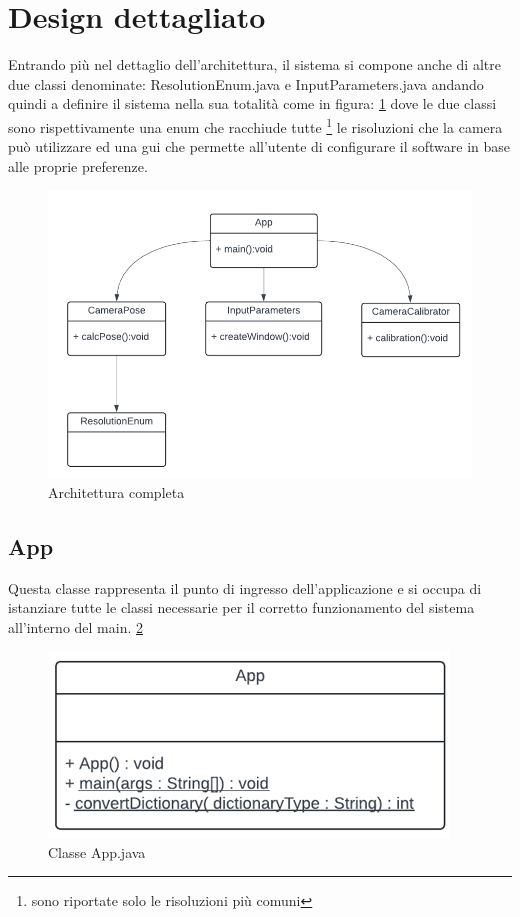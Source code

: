 \documentclass[12pt,a4paper,openright,twoside]{book}
\begin{document}
\section{Design dettagliato}
Entrando più nel dettaglio dell'architettura, il sistema si compone anche di altre due classi denominate: ResolutionEnum.java e InputParameters.java andando quindi a definire il sistema nella sua totalità come in figura: \ref{fig:architettura_completa}
dove le due classi sono rispettivamente una enum che racchiude tutte \footnote{sono riportate solo le risoluzioni più comuni} le risoluzioni che la camera può utilizzare ed una \acrfull{gui} che permette all'utente di configurare il software in base alle proprie preferenze.
\begin{figure}
	\centering
	\includegraphics[width=0.8\linewidth]{./figures/UML/fullArchitecture.png}
	\caption{Architettura completa}
	\label{fig:architettura_completa}
\end{figure}
\subsection{App}
Questa classe rappresenta il punto di ingresso dell'applicazione e si occupa di istanziare tutte le classi necessarie per il corretto funzionamento del sistema all'interno del main. \ref{fig:app}
\begin{figure}
	\centering
	\includegraphics[width=0.5\linewidth]{./figures/UML/app.png}
	\caption{Classe App.java}
	\label{fig:app}
\end{figure}
\end{document}
